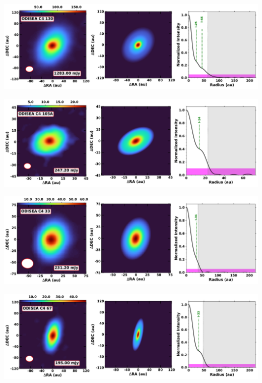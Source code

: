 \noindent
\begin{minipage}{.49\textwidth}
	 \centering
	 	 \hrulesep
	 	 \includegraphics[width=1\linewidth]{pdf/1+I_F/100_odisea_c4_130_cutout.pdf}
\end{minipage}%
\vrulesep
\begin{minipage}{.49\textwidth}
	 \centering
	 	 \hrulesep
	 	 \includegraphics[width=1\linewidth]{pdf/1+I_F/086_odisea_c4_105a_cutout.pdf}
\end{minipage}%
\vspace{0pt}
\begin{minipage}{.49\textwidth}
	 \centering
	 	 \hrulesep
	 	 \includegraphics[width=1\linewidth]{pdf/1+I_F/084_odisea_c4_33_cutout.pdf}
\end{minipage}%
\vrulesep
\begin{minipage}{.49\textwidth}
	 \centering
	 	 \hrulesep
	 	 \includegraphics[width=1\linewidth]{pdf/1+I_F/079_odisea_c4_67_cutout.pdf}
\end{minipage}%
